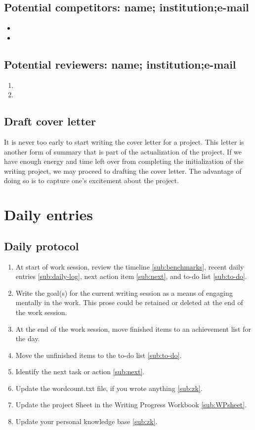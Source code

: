 \documentclass[10pt,letterpaper]{article}
\newcommand{\bi}{\begin{itemize}}
\newcommand{\ei}{\end{itemize}}
\newcommand{\be}{\begin{enumerate}}
\newcommand{\ee}{\end{enumerate}}
\begin{document}
\subsection{Potential competitors: name; institution;e-mail}
\label{sub:competitors}

\bi
\item
\item 
\ei



\subsection{Potential reviewers: name; institution;e-mail}
\label{sub:reviewers}

\be
    \item 
    \item
\ee


\subsection{Draft cover letter}
\label{sub:coverletter}

It is never too early to start writing the cover letter for a project.
This letter is another form of summary that is part of the actualization of the project.
If we have enough energy and time left over from completing the initialization of the writing project, we may proceed to drafting the cover letter.
The advantage of doing so is to capture one's excitement about the project.


\section{Daily entries}
\label{sec:dailyEntries}

\subsection{Daily protocol}
\label{sub:entry-protocol}

\be
\item At start of work session, review the timeline \ref{sub:benchmarks}, recent daily entries \ref{sub:daily-log}, next action item \ref{sub:next}, and to-do list \ref{sub:to-do}.
\item Write the goal(s) for the current writing session as a means of engaging mentally in the work. This prose could be retained or deleted at the end of the work session.
\item At the end of the work session, move finished items to an achievement list for the day.
\item Move the unfinished items to the to-do list \ref{sub:to-do}.
\item Identify the next task or action \ref{sub:next}.
\item Update the wordcount.txt file, if you wrote anything \ref{sub:zk}.
\item Update the project Sheet in the Writing Progress Workbook \ref{sub:WPsheet}.
\item Update your personal knowledge base \ref{sub:zk}.
\ee
\end{document}
